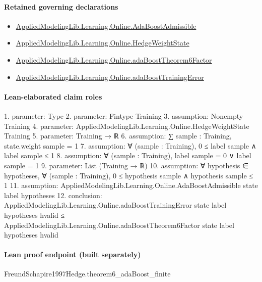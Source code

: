 \documentclass[10pt]{article}
\begin{document}
\paragraph{Retained governing declarations}
\begin{itemize}\raggedright
\item \hyperlink{library-prerequisite-2771987b29f636cf}{Applied\allowbreak{}Modeling\allowbreak{}Lib.\allowbreak{}Learning.\allowbreak{}Online.\allowbreak{}Ada\allowbreak{}Boost\allowbreak{}Admissible}
\item \hyperlink{library-prerequisite-8196082d02788389}{Applied\allowbreak{}Modeling\allowbreak{}Lib.\allowbreak{}Learning.\allowbreak{}Online.\allowbreak{}Hedge\allowbreak{}Weight\allowbreak{}State}
\item \hyperlink{library-prerequisite-86f06e91fc897699}{Applied\allowbreak{}Modeling\allowbreak{}Lib.\allowbreak{}Learning.\allowbreak{}Online.\allowbreak{}ada\allowbreak{}Boost\allowbreak{}Theorem6\allowbreak{}Factor}
\item \hyperlink{governing-declaration-0e5e303d5e8eab7c}{Applied\allowbreak{}Modeling\allowbreak{}Lib.\allowbreak{}Learning.\allowbreak{}Online.\allowbreak{}ada\allowbreak{}Boost\allowbreak{}Training\allowbreak{}Error}
\end{itemize}
\paragraph{Lean-elaborated claim roles}\begin{ReviewVerbatim}
1. parameter: Type
2. parameter: Fintype Training
3. assumption: Nonempty Training
4. parameter: AppliedModelingLib.Learning.Online.HedgeWeightState Training
5. parameter: Training → ℝ
6. assumption: ∑ sample : Training, state.weight sample = 1
7. assumption: ∀ (sample : Training), 0 ≤ label sample ∧ label sample ≤ 1
8. assumption: ∀ (sample : Training), label sample = 0 ∨ label sample = 1
9. parameter: List (Training → ℝ)
10. assumption: ∀ hypothesis ∈ hypotheses, ∀ (sample : Training), 0 ≤ hypothesis sample ∧ hypothesis sample ≤ 1
11. assumption: AppliedModelingLib.Learning.Online.AdaBoostAdmissible state label hypotheses
12. conclusion: AppliedModelingLib.Learning.Online.adaBoostTrainingError state label hypotheses hvalid ≤
  AppliedModelingLib.Learning.Online.adaBoostTheorem6Factor state label hypotheses hvalid
\end{ReviewVerbatim}

\paragraph{Lean proof endpoint (built separately)}\begin{ReviewVerbatim}
FreundSchapire1997Hedge.theorem6_adaBoost_finite
\end{ReviewVerbatim}
\end{document}
